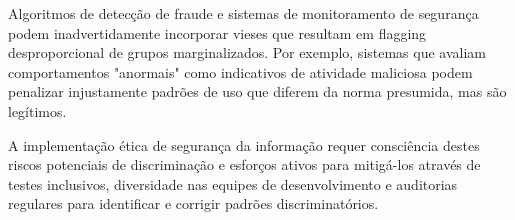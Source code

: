 Algoritmos de detecção de fraude e sistemas de monitoramento de segurança podem inadvertidamente incorporar vieses que resultam em flagging desproporcional de grupos marginalizados. Por exemplo, sistemas que avaliam comportamentos "anormais" como indicativos de atividade maliciosa podem penalizar injustamente padrões de uso que diferem da norma presumida, mas são legítimos.

A implementação ética de segurança da informação requer consciência destes riscos potenciais de discriminação e esforços ativos para mitigá-los através de testes inclusivos, diversidade nas equipes de desenvolvimento e auditorias regulares para identificar e corrigir padrões discriminatórios. 